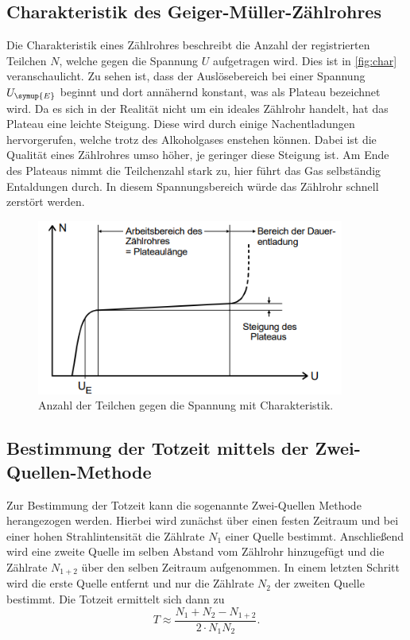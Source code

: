 \subsection{Charakteristik des Geiger-Müller-Zählrohres}
Die Charakteristik eines Zählrohres beschreibt die Anzahl der registrierten Teilchen $N$, welche gegen die Spannung $U$ aufgetragen wird.
Dies ist in \autoref{fig:char} veranschaulicht. Zu sehen ist, dass der Auslösebereich bei einer Spannung $U_{\symup{E}}$ beginnt und dort
annähernd konstant, was als Plateau bezeichnet wird. Da es sich in der Realität nicht um ein ideales Zählrohr handelt, hat das Plateau
eine leichte Steigung. Diese wird durch einige Nachentladungen hervorgerufen, welche trotz des Alkoholgases enstehen können. Dabei
ist die Qualität eines Zählrohres umso höher, je geringer diese Steigung ist. Am Ende des Plateaus nimmt die Teilchenzahl stark zu, hier
führt das Gas selbständig Entaldungen durch.
In diesem Spannungsbereich würde das Zählrohr schnell zerstört werden.
\begin{figure}
    \centering
    \includegraphics[width=0.9\textwidth]{content/charakteristik.png}
    \caption{Anzahl der Teilchen gegen die Spannung mit Charakteristik.}
    \label{fig:char}
\end{figure}
\subsection{Bestimmung der Totzeit mittels der Zwei-Quellen-Methode}
Zur Bestimmung der Totzeit kann die sogenannte Zwei-Quellen Methode herangezogen werden. Hierbei wird zunächst über einen festen
Zeitraum und bei einer hohen Strahlintensität die Zählrate $N_1$ einer Quelle bestimmt. Anschließend wird eine
zweite Quelle im selben Abstand vom Zählrohr hinzugefügt und die Zählrate $N_{1+2}$ über den selben Zeitraum  aufgenommen. In einem letzten
Schritt wird die erste Quelle entfernt und nur die Zählrate $N_2$ der zweiten Quelle bestimmt. Die Totzeit ermittelt sich dann zu
\begin{equation}
\label{eqn:totzeit}
T \approx \frac{N_1 + N_2 - N_{1+2}}{2\cdot N_1 N_2}.
\end{equation}
